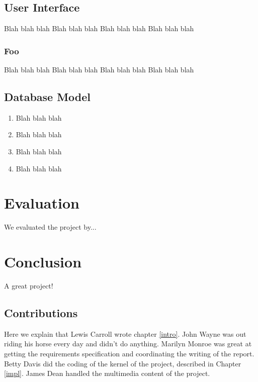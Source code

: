 \documentclass{l3proj}
\begin{document}
\section{User Interface}

Blah blah blah
Blah blah blah
Blah blah blah
Blah blah blah

\subsection{Foo}

Blah blah blah
Blah blah blah
Blah blah blah
Blah blah blah

\section{Database Model}

\begin{enumerate}
\item Blah blah blah
\item Blah blah blah
\item Blah blah blah
\item Blah blah blah
\end{enumerate}



\chapter{Evaluation}

We evaluated the project by...

\chapter{Conclusion}

A great project!

\section{Contributions}

Here we explain that Lewis Carroll wrote chapter \ref{intro}. John Wayne
was out riding his horse every day and didn't do anything. Marilyn Monroe
was great at getting the requirements specification and coordinating the
writing of the report. Betty Davis did the coding of the kernel of the
project, described in Chapter \ref{impl}.  James Dean handled the
multimedia content of the project.



\end{document}
